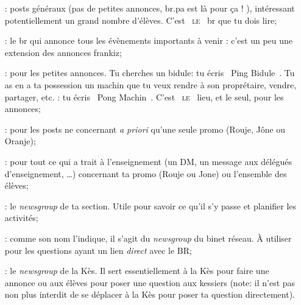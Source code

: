 \begin{itemize}
\item[\ngname{br.eleves} :] posts généraux (pas de petites annonces, br.pa est là pour ça ! ), intéressant potentiellement un grand nombre d'élèves. C'est \guillemotleft{}~\textsc{le}~\guillemotright{} br que tu dois lire;

\item[\ngname{br.eleves.evenements} :] le br qui annonce tous les évènements importants à venir : c'est un peu une extension des annonces frankiz;
	 
\item[\ngname{br.pa} :] pour les petites annonces. Tu cherches un bidule: tu écris \guillemotleft{}~Ping Bidule~\guillemotright{}. Tu as en a ta possession un machin que tu veux rendre à son proprétaire, vendre, partager, etc. : tu écris \guillemotleft{}~Pong Machin~\guillemotright{}. C'est \guillemotleft{}~\textsc{le}~\guillemotright{} lieu, et le seul, pour les annonces;





\item[\ngname{br.promo.ta\_promo} :] pour les posts ne concernant \emph{a priori} qu'une seule promo (Rouje, J\^one ou Oranje);
	 
\item[\ngname{br.enseignement.*} :] pour tout ce qui a trait à l'enseignement (un DM, un message aux délégués d'enseignement, \dots) concernant ta promo (Rouje ou Jone) ou l'ensemble des élèves;
 
\item[\ngname{br.section.ta\_section\_sportive} :] le \emph{newsgroup} de ta section. Utile pour savoir ce qu'il s'y passe et planifier les activités;

\item[\ngname{br.binet.br} :] comme son nom l'indique, il s'agit du \emph{newsgroup} du binet réseau. \`A utiliser pour les questions ayant un lien \emph{direct} avec le BR;

\item[\ngname{br.kes} :] le \emph{newsgroup} de la Kès. Il sert essentiellement à la Kès pour faire une annonce ou aux élèves pour poser une question aux kessiers (note: il n'est pas non plus interdit de se déplacer à la Kès pour poser ta question directement).

\end{itemize}



